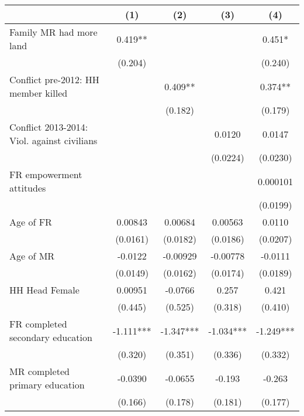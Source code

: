 {
\def\sym#1{\ifmmode^{#1}\else\(^{#1}\)\fi}
\begin{tabular}{l*{4}{c}}
\hline\hline
                    &\multicolumn{1}{c}{(1)}   &\multicolumn{1}{c}{(2)}   &\multicolumn{1}{c}{(3)}   &\multicolumn{1}{c}{(4)}   \\
\hline
Family MR had more land&       0.419** &               &               &       0.451*  \\
                    &     (0.204)   &               &               &     (0.240)   \\
[1em]
Conflict pre-2012: HH member killed&               &       0.409** &               &       0.374** \\
                    &               &     (0.182)   &               &     (0.179)   \\
[1em]
Conflict 2013-2014: Viol. against civilians&               &               &      0.0120   &      0.0147   \\
                    &               &               &    (0.0224)   &    (0.0230)   \\
[1em]
FR empowerment attitudes&               &               &               &    0.000101   \\
                    &               &               &               &    (0.0199)   \\
[1em]
Age of FR           &     0.00843   &     0.00684   &     0.00563   &      0.0110   \\
                    &    (0.0161)   &    (0.0182)   &    (0.0186)   &    (0.0207)   \\
[1em]
Age of MR           &     -0.0122   &    -0.00929   &    -0.00778   &     -0.0111   \\
                    &    (0.0149)   &    (0.0162)   &    (0.0174)   &    (0.0189)   \\
[1em]
HH Head Female      &     0.00951   &     -0.0766   &       0.257   &       0.421   \\
                    &     (0.445)   &     (0.525)   &     (0.318)   &     (0.410)   \\
[1em]
FR completed secondary education&      -1.111***&      -1.347***&      -1.034***&      -1.249***\\
                    &     (0.320)   &     (0.351)   &     (0.336)   &     (0.332)   \\
[1em]
MR completed primary education&     -0.0390   &     -0.0655   &      -0.193   &      -0.263   \\
                    &     (0.166)   &     (0.178)   &     (0.181)   &     (0.177)   \\

\end{tabular}}
